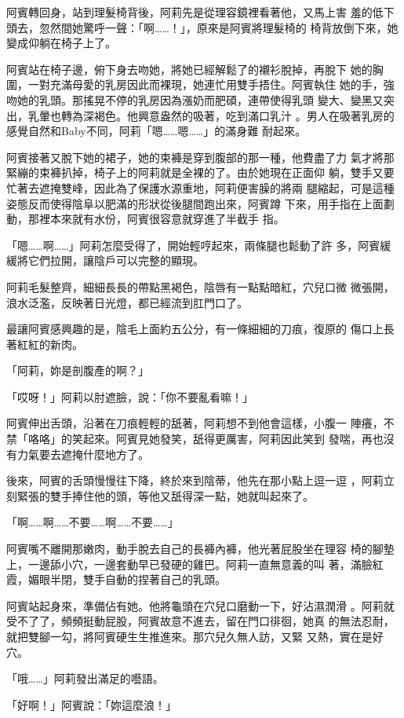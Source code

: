 阿賓轉回身，站到理髮椅背後，阿莉先是從理容鏡裡看著他，又馬上害
羞的低下頭去，忽然間她驚呼一聲：「啊……！」，原來是阿賓將理髮椅的
椅背放倒下來，她變成仰躺在椅子上了。

阿賓站在椅子邊，俯下身去吻她，將她已經解鬆了的襯衫脫掉，再脫下
她的胸圍，一對充滿母愛的乳房因此而裸現，她連忙用雙手捂住。阿賓執住
她的手，強吻她的乳頭。那搖晃不停的乳房因為漲奶而肥碩，連帶使得乳頭
變大、變黑又突出，乳暈也轉為深褐色。他興意盎然的吸著，吃到滿口乳汁
。男人在吸著乳房的感覺自然和Baby不同，阿莉「嗯……嗯……」的滿身難
耐起來。

阿賓接著又脫下她的裙子，她的束褲是穿到腹部的那一種，他費盡了力
氣才將那緊繃的束褲扒掉，椅子上的阿莉就是全裸的了。由於她現在正面仰
躺，雙手又要忙著去遮掩雙峰，因此為了保護水源重地，阿莉便害臊的將兩
腿縮起，可是這種姿態反而使得陰阜以肥滿的形狀從後腿間跑出來，阿賓蹲
下來，用手指在上面劃動，那裡本來就有水份，阿賓很容意就穿進了半截手
指。

「嗯……啊……」阿莉怎麼受得了，開始輕哼起來，兩條腿也鬆動了許
多，阿賓緩緩將它們拉開，讓陰戶可以完整的顯現。

阿莉毛髮整齊，細細長長的帶點黑褐色，陰唇有一點點暗紅，穴兒口微
微張開，浪水泛濫，反映著日光燈，都已經流到肛門口了。

最讓阿賓感興趣的是，陰毛上面約五公分，有一條細細的刀痕，復原的
傷口上長著紅紅的新肉。

「阿莉，妳是剖腹產的啊？」

「哎呀！」阿莉以肘遮臉，說：「你不要亂看嘛！」

阿賓伸出舌頭，沿著在刀痕輕輕的舐著，阿莉想不到他會這樣，小腹一
陣癢，不禁「咯咯」的笑起來。阿賓見她發笑，舐得更厲害，阿莉因此笑到
發喘，再也沒有力氣要去遮掩什麼地方了。

後來，阿賓的舌頭慢慢往下降，終於來到陰蒂，他先在那小點上逗一逗
，阿莉立刻緊張的雙手捧住他的頭，等他又舐得深一點，她就叫起來了。

「啊……啊……不要……啊……不要……」

阿賓嘴不離開那嫩肉，動手脫去自己的長褲內褲，他光著屁股坐在理容
椅的腳墊上，一邊舔小穴，一邊套動早已發硬的雞巴。阿莉一直無意義的叫
著，滿臉紅霞，媚眼半閉，雙手自動的捏著自己的乳頭。

阿賓站起身來，準備佔有她。他將龜頭在穴兒口磨動一下，好沾濕潤滑
。阿莉就受不了了，頻頻挺動屁股，阿賓故意不進去，留在門口徘徊，她真
的無法忍耐，就把雙腳一勾，將阿賓硬生生推進來。那穴兒久無人訪，又緊
又熱，實在是好穴。

「哦……」阿莉發出滿足的囈語。

「好啊！」阿賓說：「妳這麼浪！」

